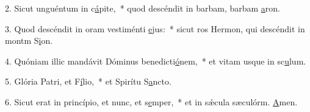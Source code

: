 2. Sicut unguéntum in c\uline{á}pite,~* quod descéndit in barbam, barbam \uline{a}ron.\par 
3. Quod descéndit in oram vestiménti \uline{e}jus:~* sicut ros Hermon, qui descéndit in montm S\uline{i}on.\par 
4. Quóniam illic mandávit Dóminus benedicti\uline{ó}nem,~* et vitam usque in sc\uline{u}lum.\par 
5. Glória Patri, et F\uline{í}lio,~* et Spirítu S\uline{a}ncto.\par 
6. Sicut erat in princípio, et nunc, et s\uline{e}mper,~* et in sǽcula sæculórm. \uline{A}men.\par 
